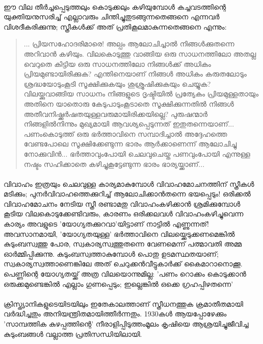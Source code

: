 \paragraph{}

ഈ വില തീർച്ചപ്പെടുത്തലും കൊടുക്കലും കഴിയുമ്പോൾ കച്ചവടത്തിന്റെ യുക്തിയനുസരിച്ച് എല്ലാവരും ചിന്തിച്ചുതുടങ്ങുന്നതെങ്ങനെ എന്നവർ വിശദീകരിക്കുന്നു; സ്ത്രീകൾക്ക് അത് പ്രതികൂലമാകുന്നതെങ്ങനെ എന്നും:

\begin{quotation}
... പ്രിയസഹോദരിമാരെ! അല്പം ആലോചിച്ചാൽ നിങ്ങൾക്കുതന്നെ അറിവാൻ കഴിയും. വിലകൊടുത്തു വാങ്ങിയ ഒരു സാധനത്തിലോ അതല്ല വെറുതെ കിട്ടിയ ഒരു സാധനത്തിലോ നിങ്ങൾക്ക് അധികം പ്രിയമുണ്ടായിരിക്കുക? എന്തിനെയാണ് നിങ്ങൾ അധികം കരുതലോടും ശ്രദ്ധയോടുംകൂടി സൂക്ഷിക്കുകയും ശുശ്രൂഷിക്കുകയും ചെയ്യുക? വിലയ്ക്കുവാങ്ങിയ സാധനം നിങ്ങളുടെ ദൃഷ്ടിയിൽ പ്രത്യേകം പ്രിയമുള്ളതായും അതിനെ യാതൊരു കേടുപാടുംകൂടാതെ സൂക്ഷിക്കുന്നതിൽ നിങ്ങൾ അതീവനിഷ്ക്കർഷതയുള്ളവരുമായിരിക്കയില്ലെ? പുരുഷന്മാർ നിങ്ങളിൽനിന്നും മുഖ്യമായി ആവശ്യപ്പെടുന്നത് ഇതുതന്നെയാണ്... പണംകൊടുത്ത് ഒരു ഭർത്താവിനെ സമ്പാദിച്ചാൽ അദ്ദേഹത്തെ വേണ്ടപോലെ സൂക്ഷിക്കേണ്ടുന്ന ഭാരം ആർക്കാണെന്ന് ആലോചിച്ചു നോക്കുവിൻ... ഭർത്താവുംപോയി ചെലവുചെയ്ത പണവുംപോയി എന്നുള്ള നഷ്ടം സഹിക്കാതെ കഴിച്ചുകൂട്ടേണ്ടുന്ന ഭാരം ഭാര്യയ്ക്കാണ്...
\end{quotation}

\paragraph{}വിവാഹം ഇത്രയും ചെലവുള്ള കാര്യമാകുമ്പോൾ വിവാഹമോചനത്തിന് സ്ത്രീകൾ മടിക്കും; പുനർവിവാഹത്തെക്കുറിച്ച് ആലോചിക്കാൻതന്നെ ഭയപ്പെടും! ഒരിക്കൽ വിവാഹമോചനം നേടിയ സ്ത്രീ രണ്ടാമതു വിവാഹംകഴിക്കാൻ ശ്രമിക്കുമ്പോൾ കൂടിയ വിലകൊടുക്കേണ്ടിവരും, കാരണം ഒരിക്കലവൾ വിവാഹംകഴിച്ചുവെന്ന കാര്യം അവളുടെ 'യോഗ്യതക്കുറവാ'യിട്ടാണ് നാട്ടിൽ എണ്ണുന്നത്! അവസാനമായി, 'യോഗ്യതയുള്ള' ഭർത്താവിനെ വിലയ്ക്കെടുക്കണമെങ്കിൽ കുടുംബസ്വത്തു പോര, സ്വകാര്യസ്വത്തുതന്നെ വേണമെന്ന് പത്മാവതി അമ്മ ഓർമ്മിപ്പിക്കുന്നു. കുടുംബസ്വത്താകുമ്പോൾ പൊതു ഉടമസ്ഥതയാണ്; സ്വകാര്യസ്വത്താണെങ്കിലേ അത് ചെറുക്കൻവീട്ടുകാർക്ക് കൈമാറാനൊക്കൂ. പെണ്ണിന്റെ യോഗ്യതയ്ക്ക് അത്ര വിലയൊന്നുമില്ല: 'പണം റൊക്കം കൊടുക്കാൻ ഒരുക്കമുണ്ടെങ്കിൽ എല്ലാം ഗുണപ്പെടും; ഇല്ലെങ്കിൽ ഒക്കെ ഗ്രഹപ്പിഴതന്നെ'

\paragraph{}ക്രിസ്ത്യാനികളുടെയിടയിലും ഇതേകാലത്താണ് സ്ത്രീധനത്തുക ക്രമാതീതമായി വർദ്ധിച്ചതും അനിയന്ത്രിതമായിത്തീർന്നതും. 1930കൾ ആയപ്പോഴേക്കും 'സാമ്പത്തിക കുഴപ്പത്തിന്റെ' നീരാളിപ്പിടുത്തംമൂലം കൃഷിയെ ആശ്രയിച്ചുജീവിച്ച കുടുംബങ്ങൾ വല്ലാത്ത പ്രതിസന്ധിയിലായി. 

